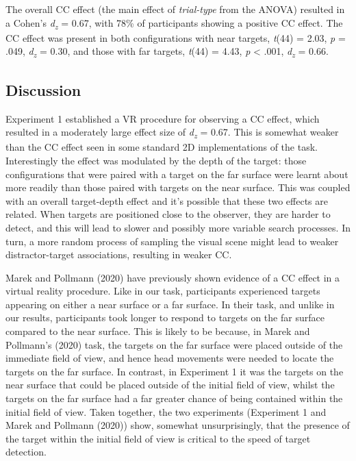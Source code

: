 \documentclass[
  english,
  man,floatsintext]{apa7}
\begin{document}
The overall CC effect (the main effect of \emph{trial-type} from the ANOVA) resulted in a Cohen's \emph{d\textsubscript{z}} = 0.67, with 78\% of participants showing a positive CC effect. The CC effect was present in both configurations with near targets, \emph{t}(44) = 2.03, \emph{p} = .049, \emph{d\textsubscript{z}} = 0.30, and those with far targets, \emph{t}(44) = 4.43, \emph{p} \textless{} .001, \emph{d\textsubscript{z}} = 0.66.

\hypertarget{discussion}{%
\subsection{Discussion}\label{discussion}}

Experiment 1 established a VR procedure for observing a CC effect, which resulted in a moderately large effect size of \emph{d\textsubscript{z}} = 0.67. This is somewhat weaker than the CC effect seen in some standard 2D implementations of the task. Interestingly the effect was modulated by the depth of the target: those configurations that were paired with a target on the far surface were learnt about more readily than those paired with targets on the near surface. This was coupled with an overall target-depth effect and it's possible that these two effects are related. When targets are positioned close to the observer, they are harder to detect, and this will lead to slower and possibly more variable search processes. In turn, a more random process of sampling the visual scene might lead to weaker distractor-target associations, resulting in weaker CC.

Marek and Pollmann (2020) have previously shown evidence of a CC effect in a virtual reality procedure. Like in our task, participants experienced targets appearing on either a near surface or a far surface. In their task, and unlike in our results, participants took longer to respond to targets on the far surface compared to the near surface. This is likely to be because, in Marek and Pollmann's (2020) task, the targets on the far surface were placed outside of the immediate field of view, and hence head movements were needed to locate the targets on the far surface. In contrast, in Experiment 1 it was the targets on the near surface that could be placed outside of the initial field of view, whilst the targets on the far surface had a far greater chance of being contained within the initial field of view. Taken together, the two experiments (Experiment 1 and Marek and Pollmann (2020)) show, somewhat unsurprisingly, that the presence of the target within the initial field of view is critical to the speed of target detection.
\end{document}
